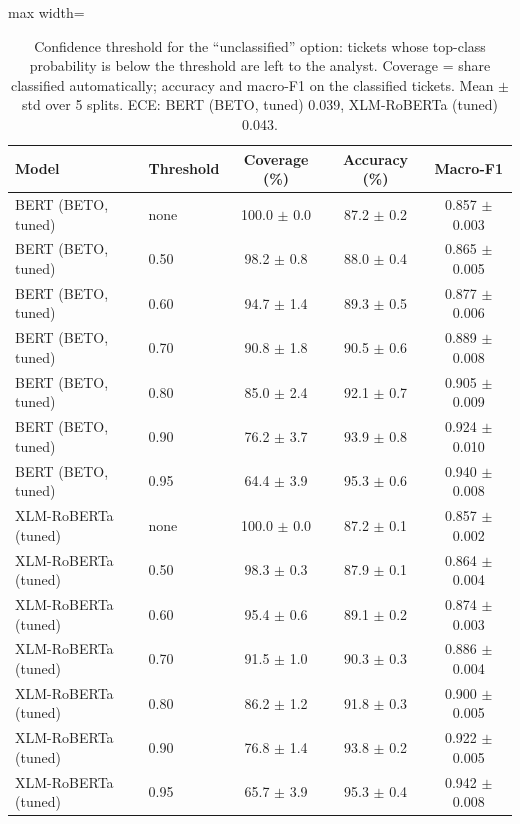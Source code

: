 \begin{table}[!t]
\centering
\caption{Confidence threshold for the ``unclassified'' option: tickets whose top-class probability is below the threshold are left to the analyst. Coverage = share classified automatically; accuracy and macro-F1 on the classified tickets. Mean $\pm$ std over 5 splits. ECE: BERT (BETO, tuned) 0.039, XLM-RoBERTa (tuned) 0.043.}
\label{tab:confidence}
\footnotesize
\begin{adjustbox}{max width=\textwidth}
\begin{tabular}{llccc}
\hline
Model & Threshold & Coverage (\%) & Accuracy (\%) & Macro-F1 \\
\hline
BERT (BETO, tuned) & none & 100.0 $\pm$ 0.0 & 87.2 $\pm$ 0.2 & 0.857 $\pm$ 0.003 \\
BERT (BETO, tuned) & 0.50 & 98.2 $\pm$ 0.8 & 88.0 $\pm$ 0.4 & 0.865 $\pm$ 0.005 \\
BERT (BETO, tuned) & 0.60 & 94.7 $\pm$ 1.4 & 89.3 $\pm$ 0.5 & 0.877 $\pm$ 0.006 \\
BERT (BETO, tuned) & 0.70 & 90.8 $\pm$ 1.8 & 90.5 $\pm$ 0.6 & 0.889 $\pm$ 0.008 \\
BERT (BETO, tuned) & 0.80 & 85.0 $\pm$ 2.4 & 92.1 $\pm$ 0.7 & 0.905 $\pm$ 0.009 \\
BERT (BETO, tuned) & 0.90 & 76.2 $\pm$ 3.7 & 93.9 $\pm$ 0.8 & 0.924 $\pm$ 0.010 \\
BERT (BETO, tuned) & 0.95 & 64.4 $\pm$ 3.9 & 95.3 $\pm$ 0.6 & 0.940 $\pm$ 0.008 \\
XLM-RoBERTa (tuned) & none & 100.0 $\pm$ 0.0 & 87.2 $\pm$ 0.1 & 0.857 $\pm$ 0.002 \\
XLM-RoBERTa (tuned) & 0.50 & 98.3 $\pm$ 0.3 & 87.9 $\pm$ 0.1 & 0.864 $\pm$ 0.004 \\
XLM-RoBERTa (tuned) & 0.60 & 95.4 $\pm$ 0.6 & 89.1 $\pm$ 0.2 & 0.874 $\pm$ 0.003 \\
XLM-RoBERTa (tuned) & 0.70 & 91.5 $\pm$ 1.0 & 90.3 $\pm$ 0.3 & 0.886 $\pm$ 0.004 \\
XLM-RoBERTa (tuned) & 0.80 & 86.2 $\pm$ 1.2 & 91.8 $\pm$ 0.3 & 0.900 $\pm$ 0.005 \\
XLM-RoBERTa (tuned) & 0.90 & 76.8 $\pm$ 1.4 & 93.8 $\pm$ 0.2 & 0.922 $\pm$ 0.005 \\
XLM-RoBERTa (tuned) & 0.95 & 65.7 $\pm$ 3.9 & 95.3 $\pm$ 0.4 & 0.942 $\pm$ 0.008 \\
\hline
\end{tabular}
\end{adjustbox}
\end{table}
